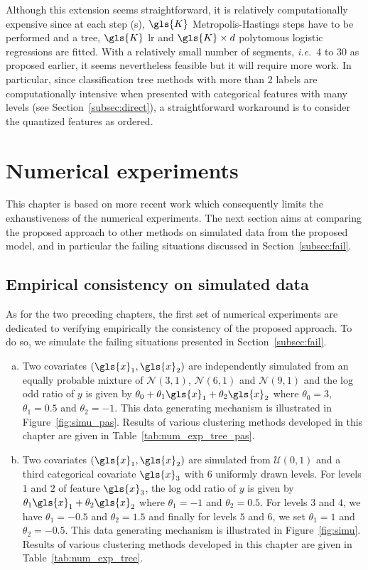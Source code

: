 Although this extension seems straightforward, it is relatively computationally expensive since at each step (s), $\gls{K}$ Metropolis-Hastings steps have to be performed and a tree, $\gls{K}$ \gls{lr} and $\gls{K} \times d$ polytomous logistic regressions are fitted. With a relatively small number of segments, \textit{i.e.}\ 4 to 30 as proposed earlier, it seems nevertheless feasible but it will require more work. In particular, since classification tree methods with more than 2 labels are computationally intensive when presented with categorical features with many levels (see Section~\ref{subsec:direct}), a straightforward workaround is to consider the quantized features as ordered.

\section{Numerical experiments} \label{sec:num_exp}

This chapter is based on more recent work which consequently limits the exhaustiveness of the numerical experiments. The next section aims at comparing the proposed approach to other methods on simulated data from the proposed model, and in particular the failing situations discussed in Section~\ref{subsec:fail}.

\subsection{Empirical consistency on simulated data} \label{subsec:num_sim}

As for the two preceding chapters, the first set of numerical experiments are dedicated to verifying empirically the consistency of the proposed approach. To do so, we simulate the failing situations presented in Section~\ref{subsec:fail}.

\begin{enumerate}[(a)]
\item Two covariates $(\gls{x}_1,\gls{x}_2)$ are independently simulated from an equally probable mixture of $\mathcal{N}(3,1)$, $\mathcal{N}(6,1)$ and $\mathcal{N}(9,1)$ and the log odd ratio of $y$ is given by $\theta_0 + \theta_1 \gls{x}_1 + \theta_2 \gls{x}_2$ where $\theta_0 = 3$, $\theta_1 = 0.5$ and $\theta_2 = -1$. This data generating mechanism is illustrated in Figure~\ref{fig:simu_pas}. Results of various clustering methods developed in this chapter are given in Table~\ref{tab:num_exp_tree_pas}.
\item Two covariates $(\gls{x}_1,\gls{x}_2)$ are simulated from $\mathcal{U}(0,1)$ and a third categorical covariate $\gls{x}_3$ with 6 uniformly drawn levels. For levels $1$ and $2$ of feature $\gls{x}_3$, the log odd ratio of $y$ is given by $\theta_1 \gls{x}_1 + \theta_2 \gls{x}_2$ where $\theta_1 = -1$ and $\theta_2 = 0.5$. For levels $3$ and $4$, we have $\theta_1 = -0.5$ and $\theta_2 = 1.5$ and finally for levels $5$ and $6$, we set $\theta_1 = 1$ and $\theta_2 = -0.5$. This data generating mechanism is illustrated in Figure~\ref{fig:simu}. Results of various clustering methods developed in this chapter are given in Table~\ref{tab:num_exp_tree}.
\end{enumerate}

